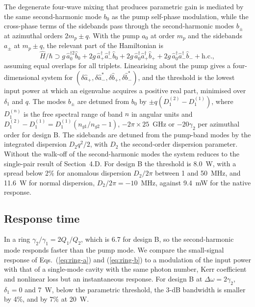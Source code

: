 \documentclass[9pt]{osa-supplemental-document}
\newcommand{\Dom}{\Delta\omega}
\begin{document}
The degenerate four-wave mixing that produces parametric gain is mediated
by the same second-harmonic mode $b_0$ as the pump self-phase modulation,
while the cross-phase terms of the sidebands pass through the
second-harmonic modes $b_\pm$ at azimuthal orders $2m_p\pm q$.  With the
pump $a_0$ at order $m_p$ and the sidebands $a_\pm$ at $m_p\pm q$, the
relevant part of the Hamiltonian is
\begin{equation}
  \hat H/\hbar\supset g\,\hat a_0^{\dagger2}\hat b_0
  +2g\,\hat a_+^\dagger\hat a_-^\dagger\hat b_0
  +2g\,\hat a_0^\dagger\hat a_+^\dagger\hat b_+
  +2g\,\hat a_0^\dagger\hat a_-^\dagger\hat b_-+\mathrm{h.c.},
\end{equation}
assuming equal overlaps for all triplets.  Linearising about the pump
gives a four-dimensional system for
$(\delta\hat a_+,\delta\hat a_-^*,\delta\hat b_+,\delta\hat b_-^*)$, and the
threshold is the lowest input power at which an eigenvalue acquires a
positive real part, minimised over $\delta_1$ and $q$.  The modes $b_\pm$
are detuned from $b_0$ by $\pm q(D_1^{(2)}-D_1^{(1)})$, where
$D_1^{(n)}$ is the free spectral range of band $n$ in angular units and
$D_1^{(2)}-D_1^{(1)}=D_1^{(1)}(n_{g1}/n_{g2}-1)$, $-2\pi\times25$~GHz or
$-20\gamma_2$ per azimuthal order for design B.  The sidebands are detuned
from the pump-band modes by the integrated dispersion $D_2q^2/2$, with
$D_2$ the second-order dispersion parameter.  Without
the walk-off of the second-harmonic modes the system reduces to the
single-pair result of Section~4.D.  For design B the threshold is
8.0~\textmu W, with a spread below 2\% for anomalous dispersion
$D_2/2\pi$ between 1 and 50~MHz, and 11.6~\textmu W for normal dispersion,
$D_2/2\pi=-10$~MHz, against 9.4~mW for the native response.

\subsection{Response time}

In a ring $\gamma_2/\gamma_1=2Q_1/Q_2$, which is 6.7 for design B, so the
second-harmonic mode responds faster than the pump mode.  We compare the
small-signal response of
Eqs.~(\ref{eq:ring-a}) and (\ref{eq:ring-b}) to a modulation of the input power
with that of a single-mode cavity with the same photon number, Kerr
coefficient and nonlinear loss but an instantaneous response.  For design
B at $\Dom=2\gamma_2$, $\delta_1=0$ and 7~\textmu W, below the parametric
threshold, the 3-dB bandwidth is smaller by 4\%, and by 7\% at
20~\textmu W.
\end{document}
